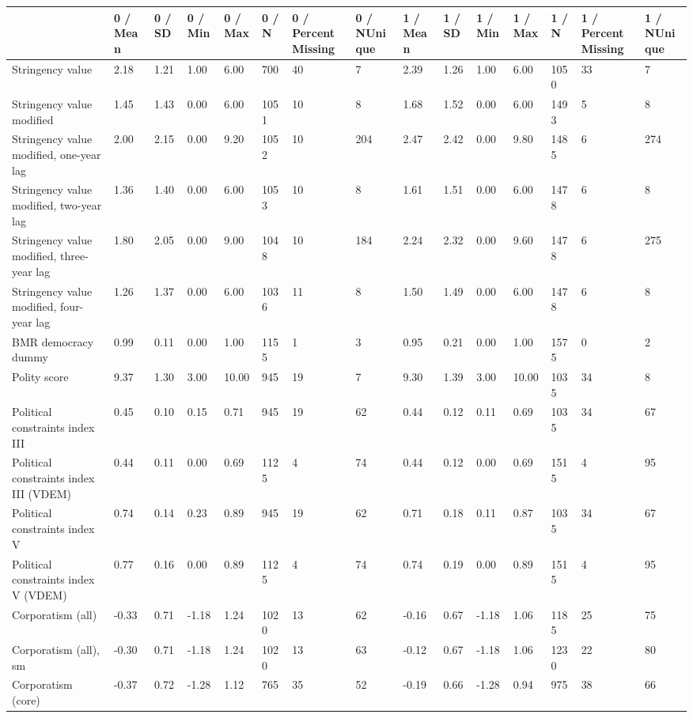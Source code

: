 
\begin{longtable}{lllllllllllllll}
\toprule
  & 0 / Mean & 0 / SD & 0 / Min & 0 / Max & 0 / N & 0 / PercentMissing & 0 / NUnique & 1 / Mean & 1 / SD & 1 / Min & 1 / Max & 1 / N & 1 / PercentMissing & 1 / NUnique\\
\midrule
Stringency value & 2.18 & 1.21 & 1.00 & 6.00 & 700 & 40 & 7 & 2.39 & 1.26 & 1.00 & 6.00 & 1050 & 33 & 7\\
Stringency value modified & 1.45 & 1.43 & 0.00 & 6.00 & 1051 & 10 & 8 & 1.68 & 1.52 & 0.00 & 6.00 & 1493 & 5 & 8\\
Stringency value modified, one-year lag & 2.00 & 2.15 & 0.00 & 9.20 & 1052 & 10 & 204 & 2.47 & 2.42 & 0.00 & 9.80 & 1485 & 6 & 274\\
Stringency value modified, two-year lag & 1.36 & 1.40 & 0.00 & 6.00 & 1053 & 10 & 8 & 1.61 & 1.51 & 0.00 & 6.00 & 1478 & 6 & 8\\
Stringency value modified, three-year lag & 1.80 & 2.05 & 0.00 & 9.00 & 1048 & 10 & 184 & 2.24 & 2.32 & 0.00 & 9.60 & 1478 & 6 & 275\\
\addlinespace
Stringency value modified, four-year lag & 1.26 & 1.37 & 0.00 & 6.00 & 1036 & 11 & 8 & 1.50 & 1.49 & 0.00 & 6.00 & 1478 & 6 & 8\\
BMR democracy dummy & 0.99 & 0.11 & 0.00 & 1.00 & 1155 & 1 & 3 & 0.95 & 0.21 & 0.00 & 1.00 & 1575 & 0 & 2\\
Polity score & 9.37 & 1.30 & 3.00 & 10.00 & 945 & 19 & 7 & 9.30 & 1.39 & 3.00 & 10.00 & 1035 & 34 & 8\\
Political constraints index III & 0.45 & 0.10 & 0.15 & 0.71 & 945 & 19 & 62 & 0.44 & 0.12 & 0.11 & 0.69 & 1035 & 34 & 67\\
Political constraints index III (VDEM) & 0.44 & 0.11 & 0.00 & 0.69 & 1125 & 4 & 74 & 0.44 & 0.12 & 0.00 & 0.69 & 1515 & 4 & 95\\
\addlinespace
Political constraints index V & 0.74 & 0.14 & 0.23 & 0.89 & 945 & 19 & 62 & 0.71 & 0.18 & 0.11 & 0.87 & 1035 & 34 & 67\\
Political constraints index V (VDEM) & 0.77 & 0.16 & 0.00 & 0.89 & 1125 & 4 & 74 & 0.74 & 0.19 & 0.00 & 0.89 & 1515 & 4 & 95\\
Corporatism (all) & -0.33 & 0.71 & -1.18 & 1.24 & 1020 & 13 & 62 & -0.16 & 0.67 & -1.18 & 1.06 & 1185 & 25 & 75\\
Corporatism (all), sm & -0.30 & 0.71 & -1.18 & 1.24 & 1020 & 13 & 63 & -0.12 & 0.67 & -1.18 & 1.06 & 1230 & 22 & 80\\
Corporatism (core) & -0.37 & 0.72 & -1.28 & 1.12 & 765 & 35 & 52 & -0.19 & 0.66 & -1.28 & 0.94 & 975 & 38 & 66\\

\end{longtable}
